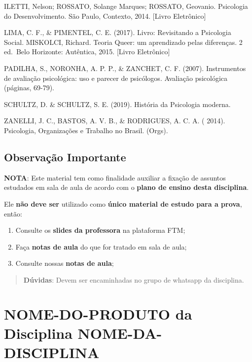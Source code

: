 \documentclass[
]{book}
\providecommand{\tightlist}{%
  \setlength{\itemsep}{0pt}\setlength{\parskip}{0pt}}
\begin{document}
ILETTI, Nelson; ROSSATO, Solange Marques; ROSSATO, Geovanio. Psicologia do Desenvolvimento. São Paulo, Contexto, 2014. {[}Livro Eletrônico{]}

LIMA, C. F., \& PIMENTEL, C. E. (2017). Livro: Revisitando a Psicologia Social. MISKOLCI, Richard. Teoria Queer: um aprendizado pelas diferenças. 2 ed.~Belo Horizonte: Autêntica, 2015. {[}Livro Eletrônico{]}

PADILHA, S., NORONHA, A. P. P., \& ZANCHET, C. F. (2007). Instrumentos de avaliação psicológica: uso e parecer de psicólogos. Avaliação psicológica (páginas, 69-79).

SCHULTZ, D. \& SCHULTZ, S. E. (2019). História da Psicologia moderna.

ZANELLI, J. C., BASTOS, A. V. B., \& RODRIGUES, A. C. A. ( 2014). Psicologia, Organizações e Trabalho no Brasil. (Orgs).

\hypertarget{observauxe7uxe3o-importante}{%
\section{Observação Importante}\label{observauxe7uxe3o-importante}}

\textbf{NOTA}: Este material tem como finalidade auxiliar a fixação de assuntos estudados em sala de aula de acordo com o \textbf{plano de ensino desta disciplina}.

Ele \textbf{não deve ser} utilizado como \textbf{único material de estudo para a prova}, então:

\begin{enumerate}
\def\labelenumi{\arabic{enumi}.}
\tightlist
\item
  Consulte os \textbf{slides da professora} na plataforma FTM;\\
\item
  Faça \textbf{notas de aula} do que for tratado em sala de aula;\\
\item
  Consulte nossas \textbf{notas de aula};
\end{enumerate}

\begin{quote}
\textbf{Dúvidas}: Devem ser encaminhadas no grupo de whatsapp da disciplina.
\end{quote}

\hypertarget{nome-do-produto-da-disciplina-nome-da-disciplina}{%
\chapter{NOME-DO-PRODUTO da Disciplina NOME-DA-DISCIPLINA}\label{nome-do-produto-da-disciplina-nome-da-disciplina}}
\end{document}
